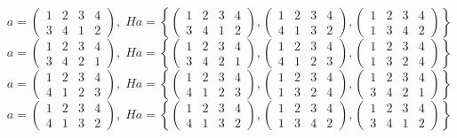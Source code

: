 \documentclass[a4paper,12pt]{article}
\begin{document}
\begin{itemize}
\[a = \begin{pmatrix} 1 & 2 & 3 & 4 \\ 3&4&1&2\end{pmatrix}, \; Ha = \left\{\begin{pmatrix} 1 & 2 & 3 & 4 \\ 3&4&1&2\end{pmatrix}, \begin{pmatrix} 1 & 2 & 3 & 4 \\ 4&1&3&2\end{pmatrix}, \begin{pmatrix} 1 & 2 & 3 & 4 \\ 1&3&4&2\end{pmatrix} \right\}\]
\[a = \begin{pmatrix} 1 & 2 & 3 & 4 \\ 3&4&2&1\end{pmatrix}, \; Ha = \left\{\begin{pmatrix} 1 & 2 & 3 & 4 \\ 3&4&2&1\end{pmatrix}, \begin{pmatrix} 1 & 2 & 3 & 4 \\ 4&1&2&3\end{pmatrix}, \begin{pmatrix} 1 & 2 & 3 & 4 \\ 1&3&2&4\end{pmatrix} \right\}\]
\[a = \begin{pmatrix} 1 & 2 & 3 & 4 \\ 4&1&2&3\end{pmatrix}, \; Ha = \left\{\begin{pmatrix} 1 & 2 & 3 & 4 \\ 4&1&2&3\end{pmatrix}, \begin{pmatrix} 1 & 2 & 3 & 4 \\ 1&3&2&4\end{pmatrix}, \begin{pmatrix} 1 & 2 & 3 & 4 \\ 3&4&2&1\end{pmatrix} \right\}\]
\[a = \begin{pmatrix} 1 & 2 & 3 & 4 \\ 4&1&3&2\end{pmatrix}, \; Ha = \left\{\begin{pmatrix} 1 & 2 & 3 & 4 \\ 4&1&3&2\end{pmatrix}, \begin{pmatrix} 1 & 2 & 3 & 4 \\ 1&3&4&2\end{pmatrix}, \begin{pmatrix} 1 & 2 & 3 & 4 \\ 3&4&1&2\end{pmatrix} \right\}\]

\end{itemize}
\end{document}
